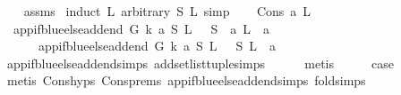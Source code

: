 \begin{isabellebody}
%
\isadelimproof
\ \ %
\endisadelimproof
%
\isatagproof
{}\isamarkupfalse%
\ assms\ \isanewline
{}\isamarkupfalse%
{\isacharparenleft}{\kern0pt}induct\ L{}\ arbitrary{\isacharcolon}{\kern0pt}\ S\ L{}{\isacharcomma}{\kern0pt}\ simp{\isacharparenright}{\kern0pt}\isanewline
\ \ \isamarkupfalse%
\ {\isacharparenleft}{\kern0pt}Cons\ a\ L{}{\isacharparenright}{\kern0pt}\isanewline
\ \ \isamarkupfalse%
\ \isamarkupfalse%
\ {\isachardoublequoteopen}\ {\isacharparenleft}{\kern0pt}app{\isacharunderscore}{\kern0pt}if{\isacharunderscore}{\kern0pt}blue{\isacharunderscore}{\kern0pt}else{\isacharunderscore}{\kern0pt}add{\isacharunderscore}{\kern0pt}end\ G\ k\ a\ {\isacharparenleft}{\kern0pt}S{\isacharcomma}{\kern0pt}\ L{}{\isacharparenright}{\kern0pt}{\isacharparenright}{\kern0pt}\ {\isacharequal}{\kern0pt}\ \ {\isacharparenleft}{\kern0pt}S\ {\isasymunion}\ {\isacharbraceleft}{\kern0pt}a{\isacharbraceright}{\kern0pt}{\isacharcomma}{\kern0pt}\ L{}\ {\isacharat}{\kern0pt}\ {\isacharbrackleft}{\kern0pt}a{\isacharbrackright}{\kern0pt}{\isacharparenright}{\kern0pt}{\isachardoublequoteclose}\isanewline
\ \ \ \ {\isacharbar}{\kern0pt}\ \ {\isachardoublequoteopen}{\isacharparenleft}{\kern0pt}app{\isacharunderscore}{\kern0pt}if{\isacharunderscore}{\kern0pt}blue{\isacharunderscore}{\kern0pt}else{\isacharunderscore}{\kern0pt}add{\isacharunderscore}{\kern0pt}end\ G\ k\ a\ {\isacharparenleft}{\kern0pt}S{\isacharcomma}{\kern0pt}\ L{}{\isacharparenright}{\kern0pt}{\isacharparenright}{\kern0pt}\ {\isacharequal}{\kern0pt}\ \ {\isacharparenleft}{\kern0pt}S{\isacharcomma}{\kern0pt}\ L{}\ {\isacharat}{\kern0pt}\ {\isacharbrackleft}{\kern0pt}a{\isacharbrackright}{\kern0pt}{\isacharparenright}{\kern0pt}{\isachardoublequoteclose}\isanewline
\ \ \ \ \isamarkupfalse%
\ app{\isacharunderscore}{\kern0pt}if{\isacharunderscore}{\kern0pt}blue{\isacharunderscore}{\kern0pt}else{\isacharunderscore}{\kern0pt}add{\isacharunderscore}{\kern0pt}end{\isachardot}{\kern0pt}simps\ add{\isacharunderscore}{\kern0pt}set{\isacharunderscore}{\kern0pt}list{\isacharunderscore}{\kern0pt}tuple{\isachardot}{\kern0pt}simps\isanewline
\ \ \ \ \isamarkupfalse%
\ metis\isanewline
\ \ \isamarkupfalse%
\ \isamarkupfalse%
\ {\isacharquery}{\kern0pt}case\isanewline
\ \ \ \ \isamarkupfalse%
\ {\isacharparenleft}{\kern0pt}metis\ Cons{\isachardot}{\kern0pt}hyps\ Cons{\isachardot}{\kern0pt}prems\ app{\isacharunderscore}{\kern0pt}if{\isacharunderscore}{\kern0pt}blue{\isacharunderscore}{\kern0pt}else{\isacharunderscore}{\kern0pt}add{\isacharunderscore}{\kern0pt}end{\isachardot}{\kern0pt}simps\ fold{\isacharunderscore}{\kern0pt}simps{\isacharparenleft}{\kern0pt}{}{\isacharparenright}{\kern0pt}{\isacharparenright}{\kern0pt}\ \isanewline

\end{isabellebody}
